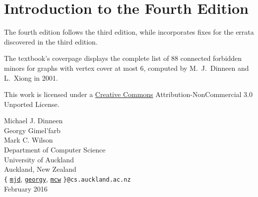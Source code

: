 \chapter*{Introduction to the Fourth Edition}

The fourth edition follows the third edition, while incorporates fixes
for the errata discovered in the third edition.  
    
\bigskip
    
The textbook's coverpage displays the complete list of 88 connected forbidden minors for graphs with
vertex cover at most 6, computed by M.~J.~Dinneen and L.~Xiong in 2001.

\bigskip 

This work is licensed under a
\href{http://creativecommons.org/licenses/by-nc/3.0/}{Creative
Commons} Attribution-NonCommercial 3.0 Unported License.

\bigskip

\begin{flushright}
Michael J. Dinneen\\
Georgy Gimel'farb\\
Mark C. Wilson\\[2ex]

Department of Computer Science\\ 
University of Auckland\\
Auckland, New Zealand\\[2ex]

\verb|{|%
\href{mailto:mjd@cs.auckland.ac.nz?subject=DGW2013\_ebook}{\texttt{mjd}},
\href{mailto:georgy@cs.auckland.ac.nz?subject=DGW2013\_ebook}{\texttt{georgy}},
\href{mailto:mcw@cs.auckland.ac.nz?subject=DGW2013\_ebook}{\texttt{mcw}}%
\verb|}@cs.auckland.ac.nz|\\[2ex]

February 2016
\end{flushright}

